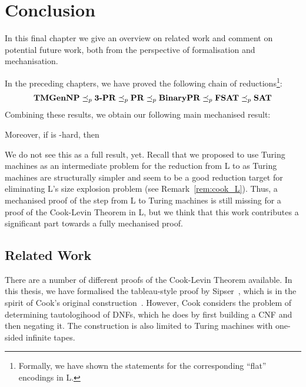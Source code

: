 \chapter{Conclusion}\label{chap:conclusion}
In this final chapter we give an overview on related work and comment on potential future work, both from the perspective of formalisation and mechanisation.

In the preceding chapters, we have proved the following chain of reductions\footnote{Formally, we have shown the statements for the corresponding ``flat'' encodings in L.}:
\begin{align*}
  \textbf{TMGenNP} \preceq_p{} \textbf{3-PR} \preceq_p{} \textbf{PR} \preceq_p{} \textbf{BinaryPR} \preceq_p{} \textbf{FSAT}{} \preceq_p{} \textbf{SAT}{} 
\end{align*}
Combining these results, we obtain our following main mechanised result:
\begin{theorem}
   Moreover, if \gennp{} is \NP{}-hard, then 
\end{theorem}
We do not see this as a full result, yet. Recall that we proposed to use Turing machines as an intermediate problem for the reduction from L to \SAT{} as Turing machines are structurally simpler and seem to be a good reduction target for eliminating L's size explosion problem (see Remark~\ref{rem:cook_L}).
Thus, a mechanised proof of the step from L to Turing machines is still missing for a proof of the Cook-Levin Theorem in L, but we think that this work contributes a significant part towards a fully mechanised proof.

\section{Related Work}
There are a number of different proofs of the Cook-Levin Theorem available. In this thesis, we have formalised the tableau-style proof by Sipser~\cite[Chapter~7.4]{Sipser:TheoryofComputation}, which is in the spirit of Cook's original construction~\cite{cook_theorem}. However, Cook considers the problem of determining tautologihood of DNFs, which he does by first building a CNF and then negating it. The construction is also limited to Turing machines with one-sided infinite tapes.


